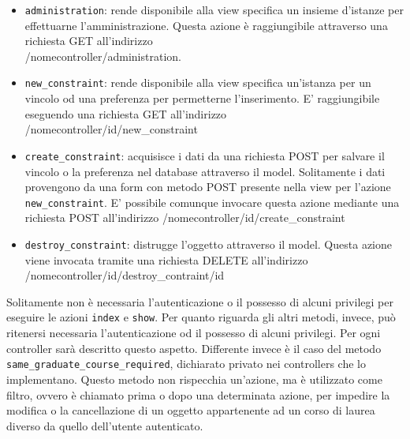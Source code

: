 \documentclass[11pt,a4paper]{article}
\begin{document}
\begin{itemize}
 \item \verb|administration|: rende disponibile alla view specifica un insieme d'istanze per effettuarne l'amministrazione. Questa azione è raggiungibile attraverso una richiesta GET all'indirizzo \\ /nomecontroller/administration.
 \item \verb|new_constraint|: rende disponibile alla view specifica un'istanza per un vincolo od una preferenza per permetterne l'inserimento. E' raggiungibile eseguendo una richiesta GET all'indirizzo \\ /nomecontroller/id/new\_constraint
 \item \verb|create_constraint|: acquisisce i dati da una richiesta POST per salvare il vincolo o la preferenza nel database attraverso il model. Solitamente i dati provengono da una form con metodo POST presente nella view per l'azione \verb|new_constraint|. E' possibile comunque invocare questa azione mediante una richiesta POST all'indirizzo /nomecontroller/id/create\_constraint
 \item \verb|destroy_constraint|: distrugge l'oggetto attraverso il model. Questa azione viene invocata tramite una richiesta DELETE all'indirizzo /nomecontroller/id/destroy\_contraint/id
\end{itemize}
Solitamente non è necessaria l'autenticazione o il possesso di alcuni privilegi per eseguire le azioni \verb|index| e \verb|show|. Per quanto riguarda gli altri metodi, invece, può ritenersi necessaria l'autenticazione od il possesso di alcuni privilegi. Per ogni controller sarà descritto questo aspetto.
Differente invece è il caso del metodo \verb|same_graduate_course_required|, dichiarato privato nei controllers che lo implementano. Questo metodo non rispecchia un'azione, ma è utilizzato come filtro, ovvero è chiamato prima o dopo una determinata azione, per impedire la modifica o la cancellazione di un oggetto appartenente ad un corso di laurea diverso da quello dell'utente autenticato.
\end{document}
